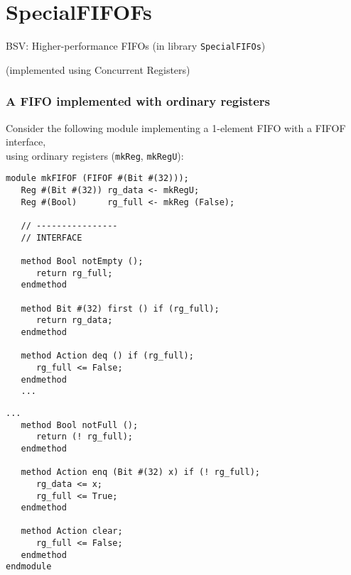 
\section{SpecialFIFOFs}

\begin{frame}

\begin{center}
  {\LARGE BSV: Higher-performance FIFOs (in library {\tt SpecialFIFOs})}

  \vspace{5ex}

  (implemented using Concurrent Registers)
\end{center}

\end{frame}


\begin{frame}[fragile]
\frametitle{A FIFO implemented with ordinary registers}

\footnotesize

Consider the following module implementing a 1-element FIFO with a
FIFOF interface, \\
using ordinary registers ({\tt mkReg}, {\tt mkRegU}):

\vspace{2ex}

\begin{center}
\begin{minipage}[t]{0.45\textwidth}\scriptsize
\begin{Verbatim}[frame=single]
module mkFIFOF (FIFOF #(Bit #(32)));
   Reg #(Bit #(32)) rg_data <- mkRegU;
   Reg #(Bool)      rg_full <- mkReg (False);

   // ----------------
   // INTERFACE

   method Bool notEmpty ();
      return rg_full;
   endmethod

   method Bit #(32) first () if (rg_full);
      return rg_data;
   endmethod

   method Action deq () if (rg_full);
      rg_full <= False;
   endmethod
   ...
\end{Verbatim}
\end{minipage}
\begin{minipage}[t]{0.45\textwidth}\scriptsize
\begin{Verbatim}[frame=single]
   ...
   method Bool notFull ();
      return (! rg_full);
   endmethod

   method Action enq (Bit #(32) x) if (! rg_full);
      rg_data <= x;
      rg_full <= True;
   endmethod

   method Action clear;
      rg_full <= False;
   endmethod
endmodule
\end{Verbatim}
\end{minipage}
\end{center}

\end{frame}

